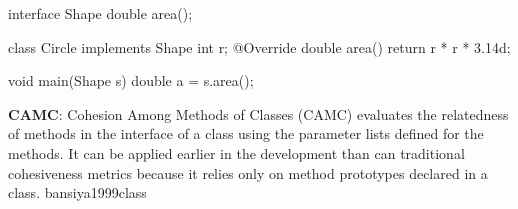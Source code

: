 \documentclass{article}
\begin{document}


\begin{pptWide}{2}
{\small\begin{ffcode}
interface Shape
  double area();

class Circle implements Shape
  int r;
  @Override
  double area()
    return r * r * 3.14d;

void main(Shape s)
  double a = s.area();
\end{ffcode}
}
\par\columnbreak\par
{}
\end{pptWide}
\plush{}

  {\textbf{CAMC}: Cohesion Among Methods of Classes (CAMC) evaluates the relatedness of methods in the interface of a class using the parameter lists defined for the methods. It can be applied earlier in the development than can traditional cohesiveness metrics because it relies only on method prototypes declared in a class.}
  {bansiya1999class}
\end{document}
